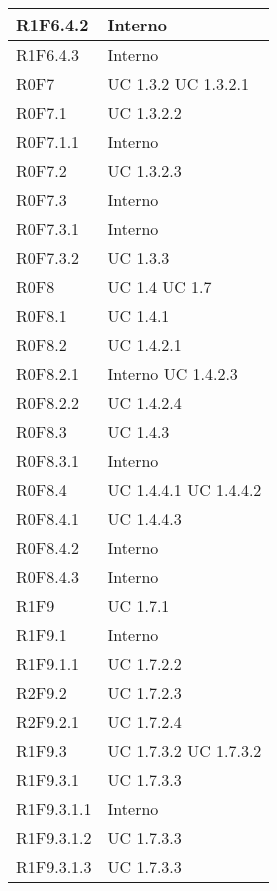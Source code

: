 \begin{center}
\begin{longtable}{| p{4cm} | p{4cm} |}
		\hline
		R1F6.4.2  &  Interno \\
		\hline
		R1F6.4.3  &  Interno \\
		\hline
		R0F7  &  UC 1.3.2 \newline UC 1.3.2.1 \\
		\hline
		R0F7.1  &  UC 1.3.2.2 \\
		\hline
		R0F7.1.1  &  Interno \\
		\hline
		R0F7.2  &  UC 1.3.2.3 \\
		\hline
		R0F7.3  &  Interno \\
		\hline
		R0F7.3.1  &  Interno \\
		\hline
		R0F7.3.2  &  UC 1.3.3 \\
		\hline
		R0F8  &  UC 1.4 \newline UC 1.7 \\
		\hline
		R0F8.1  &  UC 1.4.1 \\
		\hline
		R0F8.2  &  UC 1.4.2.1 \\
		\hline
		R0F8.2.1  &  Interno \newline UC 1.4.2.3 \\
		\hline
		R0F8.2.2  &  UC 1.4.2.4 \\
		\hline
		R0F8.3  &  UC 1.4.3 \\
		\hline
		R0F8.3.1  &  Interno \\
		\hline
		R0F8.4  &  UC 1.4.4.1 \newline UC 1.4.4.2 \\
		\hline
		R0F8.4.1  &  UC 1.4.4.3 \\
		\hline
		R0F8.4.2  &  Interno \\
		\hline
		R0F8.4.3  &  Interno \\
		\hline
		R1F9  &  UC 1.7.1 \\
		\hline
		R1F9.1  &  Interno \\
		\hline
		R1F9.1.1  &  UC 1.7.2.2 \\
		\hline
		R2F9.2  &  UC 1.7.2.3 \\
		\hline
		R2F9.2.1  &  UC 1.7.2.4 \\
		\hline
		R1F9.3  &  UC 1.7.3.2 \newline UC 1.7.3.2 \\
		\hline
		R1F9.3.1  &  UC 1.7.3.3\\
		\hline
		R1F9.3.1.1  &  Interno \\
		\hline
		R1F9.3.1.2  &  UC 1.7.3.3\\
		\hline
		R1F9.3.1.3  &  UC 1.7.3.3\\
		\hline



\end{longtable}
\end{center}
